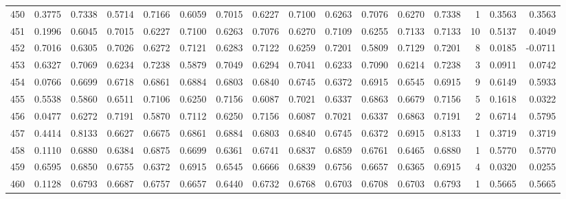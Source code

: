 \begin{tabular}{lrrrrrrrrrrrrrrr}
450 &      0.3775 &  0.7338 &  0.5714 &  0.7166 &  0.6059 &  0.7015 &  0.6227 &  0.7100 &  0.6263 &  0.7076 &   0.6270 &     0.7338 &      1 &                    0.3563 &                     0.3563 \\
451 &      0.1996 &  0.6045 &  0.7015 &  0.6227 &  0.7100 &  0.6263 &  0.7076 &  0.6270 &  0.7109 &  0.6255 &   0.7133 &     0.7133 &     10 &                    0.5137 &                     0.4049 \\
452 &      0.7016 &  0.6305 &  0.7026 &  0.6272 &  0.7121 &  0.6283 &  0.7122 &  0.6259 &  0.7201 &  0.5809 &   0.7129 &     0.7201 &      8 &                    0.0185 &                    -0.0711 \\
453 &      0.6327 &  0.7069 &  0.6234 &  0.7238 &  0.5879 &  0.7049 &  0.6294 &  0.7041 &  0.6233 &  0.7090 &   0.6214 &     0.7238 &      3 &                    0.0911 &                     0.0742 \\
454 &      0.0766 &  0.6699 &  0.6718 &  0.6861 &  0.6884 &  0.6803 &  0.6840 &  0.6745 &  0.6372 &  0.6915 &   0.6545 &     0.6915 &      9 &                    0.6149 &                     0.5933 \\
455 &      0.5538 &  0.5860 &  0.6511 &  0.7106 &  0.6250 &  0.7156 &  0.6087 &  0.7021 &  0.6337 &  0.6863 &   0.6679 &     0.7156 &      5 &                    0.1618 &                     0.0322 \\
456 &      0.0477 &  0.6272 &  0.7191 &  0.5870 &  0.7112 &  0.6250 &  0.7156 &  0.6087 &  0.7021 &  0.6337 &   0.6863 &     0.7191 &      2 &                    0.6714 &                     0.5795 \\
457 &      0.4414 &  0.8133 &  0.6627 &  0.6675 &  0.6861 &  0.6884 &  0.6803 &  0.6840 &  0.6745 &  0.6372 &   0.6915 &     0.8133 &      1 &                    0.3719 &                     0.3719 \\
458 &      0.1110 &  0.6880 &  0.6384 &  0.6875 &  0.6699 &  0.6361 &  0.6741 &  0.6837 &  0.6859 &  0.6761 &   0.6465 &     0.6880 &      1 &                    0.5770 &                     0.5770 \\
459 &      0.6595 &  0.6850 &  0.6755 &  0.6372 &  0.6915 &  0.6545 &  0.6666 &  0.6839 &  0.6756 &  0.6657 &   0.6365 &     0.6915 &      4 &                    0.0320 &                     0.0255 \\
460 &      0.1128 &  0.6793 &  0.6687 &  0.6757 &  0.6657 &  0.6440 &  0.6732 &  0.6768 &  0.6703 &  0.6708 &   0.6703 &     0.6793 &      1 &                    0.5665 &                     0.5665 \\

\end{tabular}
